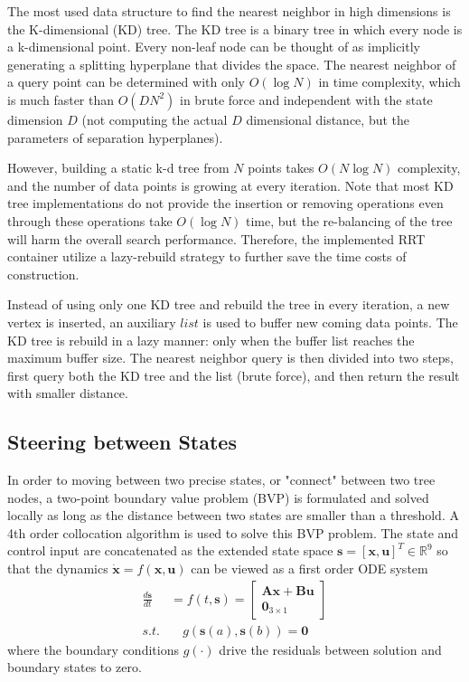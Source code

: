 \documentclass[11pt, conference]{IEEEtran}
\begin{document}
The most used data structure to find the nearest neighbor in high dimensions is the K-dimensional (KD) tree\cite{bentley1975multidimensional}.
The KD tree is a binary tree in which every node is a k-dimensional point. Every non-leaf node can be thought of as implicitly generating a splitting hyperplane that divides the space. The nearest neighbor of a query point can be determined with only $O(\log N)$ in time complexity, which is much faster than $O(DN^2)$ in brute force and independent with the state dimension $D$ (not computing the actual $D$ dimensional distance, but the parameters of separation hyperplanes).

However, building a static k-d tree from $N$ points takes $O(N \log N)$ complexity, and the number of data points is growing at every iteration. Note that most KD tree implementations do not provide the insertion or removing operations even through these operations take $O(\log N)$ time, but the re-balancing of the tree will harm the overall search performance. Therefore, the implemented RRT container utilize a lazy-rebuild strategy to further save the time costs of construction.

Instead of using only one KD tree and rebuild the tree in every iteration, a new vertex is inserted, an auxiliary $list$ is used to buffer new coming data points. The KD tree is rebuild in a lazy manner: only when the buffer list reaches the maximum buffer size. The nearest neighbor query is then divided into two steps, first query both the KD tree and the list (brute force), and then return the result with smaller distance.

\subsection{Steering between States}
In order to moving between two precise states, or "connect" between two tree nodes, a two-point boundary value problem (BVP) is formulated and solved locally as long as the distance between two states are smaller than a threshold\cite{lavalle2006planning}.
A 4th order collocation algorithm\cite{kierzenka2001bvp} is used to solve this BVP problem. The state and control input are concatenated as the extended state space $\mathbf{s} = [\mathbf{x}, \mathbf{u}]^T\in\mathbb{R}^9$ so that the dynamics $\dot{\mathbf{x}}=f(\mathbf{x}, \mathbf{u})$ can be viewed as a first order ODE system
\begin{align}
    \frac{d\mathbf{s}}{dt}
    & = f(t, \mathbf{s})
    = \begin{bmatrix}
        \mathbf{A}\mathbf{x} + \mathbf{B}\mathbf{u}\\
        \mathbf{0}_{3\times 1}
    \end{bmatrix}\\
    s.t.&\quad g(\mathbf{s}(a), \mathbf{s}(b))=\mathbf 0
\end{align}
where the boundary conditions $g(\cdot)$ drive the residuals between solution and boundary states to zero.
\end{document}
